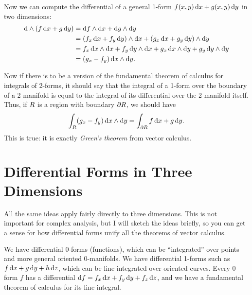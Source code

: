 \documentclass[12pt]{amsart}
\begin{document}
Now we can compute the differential of a general 1-form $f(x,y)\,{\mathrm{d} x} + g(x,y)\,{\mathrm{d} y}$ in two dimensions:
\begin{align*}
  \mathrm{d}\wedge(f\,{\mathrm{d} x} + g\,{\mathrm{d} y})
  &= {\mathrm{d} f} \wedge {\ensuremath{\mathrm{d} x}} + {\mathrm{d} g} \wedge{\ensuremath{\mathrm{d} y}}\\
  &= ({f}_{x}\, {\mathrm{d} x} + {f}_{y}\, {\mathrm{d} y}) \wedge {\ensuremath{\mathrm{d} x}} + ({g}_{x} \,{\mathrm{d} x}+{g}_{y}\,{\mathrm{d} y})\wedge{\ensuremath{\mathrm{d} y}} \\
  &= {f}_{x}\, {\mathrm{d} x}\wedge{\ensuremath{\mathrm{d} x}} + {f}_{y}\, {\mathrm{d} y}\wedge {\ensuremath{\mathrm{d} x}} + {g}_{x} \,{\mathrm{d} x} \wedge{\ensuremath{\mathrm{d} y}} + {g}_{y}\,{\mathrm{d} y}\wedge{\ensuremath{\mathrm{d} y}} \\
  &= ({g}_{x} - {f}_{y})\, {\mathrm{d} x}\wedge{\ensuremath{\mathrm{d} y}}.
\end{align*}

Now if there is to be a version of the fundamental theorem of calculus for integrals of 2-forms, it should say that the integral of a 1-form over the boundary of a 2-manifold is equal to the integral of its differential over the 2-manifold itself.
Thus, if $R$ is a region with boundary $\partial R$, we should have
\[ \int_{R} ({g}_{x} - {f}_{y})\, {\mathrm{d} x}\wedge{\ensuremath{\mathrm{d} y}} = \int_{\partial R} f\,{\mathrm{d} x} + g\,{\mathrm{d} y}. \]
This is true: it is exactly \emph{Green's theorem} from vector calculus.

\section{Differential Forms in Three Dimensions}
\label{sec:forms-in-3D}

All the same ideas apply fairly directly to three dimensions.
This is not important for complex analysis, but I will sketch the ideas briefly, so you can get a sense for how differential forms unify all the theorems of vector calculus.

We have differential 0-forms (functions), which can be ``integrated'' over points and more general oriented 0-manifolds.
We have differential 1-forms such as $f\,{\mathrm{d} x} + g\,{\mathrm{d} y} + h\,{\mathrm{d} z}$, which can be line-integrated over oriented curves.
Every 0-form $f$ has a differential ${\mathrm{d} f} = {f}_{x} \,{\mathrm{d} x} + {f}_{y}\,{\mathrm{d} y} + {f}_{z}\,{\mathrm{d} z}$, and we have a fundamental theorem of calculus for its line integral.
\end{document}
